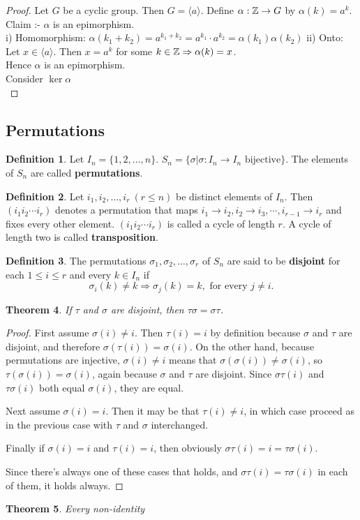 \documentclass[leqno,DIV=calc,paper=a4,fontsize=11pt]{article}
\newtheorem{thm}{Theorem}[section]
\theoremstyle{definition}
\newtheorem{defn}[thm]{Definition}
\theoremstyle{plain}
\theoremstyle{remark}
\begin{document}
\begin{proof}
Let $G$ be a cyclic group. Then $G=\langle a\rangle$. Define $\alpha:\Bbb Z\to G$ by $\alpha(k)=a^{k}$.
Claim :- $\alpha$ is an epimorphism.\\
i) Homomorphism: $\alpha(k_1+k_2)=a^{k_1+k_2}=a^{k_1}\cdot a^{k_2}=\alpha(k_1)\alpha(k_2)$
ii) Onto: Let $x\in \langle a\rangle$. Then $x=a^k$ for some $k\in \Bbb Z\Rightarrow \alpha(k)=x$.\\
Hence $\alpha$ is an epimorphism.\\
Consider $\ker \alpha$\\

\end{proof}

\subsection{Permutations}
\begin{defn}
Let $I_n=\{1,2,\ldots,n\}$. $S_n=\{\sigma| \sigma:I_n\to I_n \text{ bijective}\}$. The elements of $S_n$ are called \textbf{permutations}.
\end{defn}

\begin{defn}
Let $i_1,i_2,\ldots,i_r\ (r\leq n)$ be distinct elements of $I_n$. Then $(i_1i_2\cdots i_r)$ denotes a permutation that maps $i_1\to i_2,i_2\to i_3,\cdots,i_{r-1}\to i_r$ and fixes every other element. $(i_1i_2\cdots i_r)$ is called a cycle of length $r$. A cycle of length two is called \textbf{transposition}.
\end{defn}

\begin{defn}
The permutations $\sigma_1,\sigma_2,\ldots,\sigma_r$ of $S_n$ are said to be \textbf{disjoint} for each $1\leq i\leq r$ and every $k\in I_n$ if
$$\sigma_i(k)\neq k\Rightarrow \sigma_j(k)=k,\text{ for every } j\neq i.$$
\end{defn}
\begin{thm}
If $\tau$ and $\sigma$ are disjoint, then $\tau\sigma=\sigma\tau$.
\end{thm}

\begin{proof}
First assume $\sigma(i)\ne i$. Then $\tau(i)=i$ by definition because $\sigma$ and $\tau$ are disjoint, and therefore $\sigma(\tau(i))=\sigma(i)$. On the other hand, because permutations are injective, $\sigma(i)\ne i$ means that $\sigma(\sigma(i))\ne\sigma(i)$, so $\tau(\sigma(i))=\sigma(i)$, again because $\sigma$ and $\tau$ are disjoint. Since $\sigma\tau(i)$ and $\tau\sigma(i)$ both equal $\sigma(i)$, they are equal.

Next assume $\sigma(i)=i$. Then it may be that $\tau(i)\ne i$, in which case proceed as in the previous case with $\tau$ and $\sigma$ interchanged.

Finally if $\sigma(i)=i$ and $\tau(i)=i$, then obviously $\sigma\tau(i)=i=\tau\sigma(i)$.

Since there's always one of these cases that holds, and $\sigma\tau(i)=\tau\sigma(i)$ in each of them, it holds always.
\end{proof}
\begin{thm}
Every non-identity
\end{thm}
\end{document}

